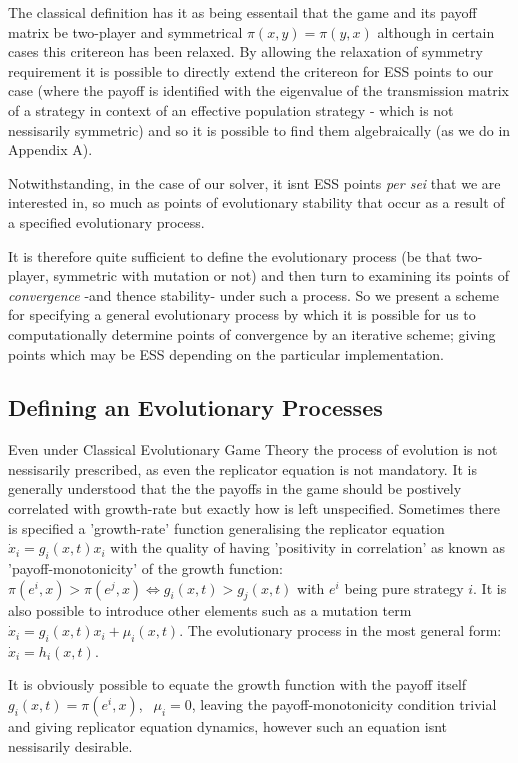 \documentclass[journal,article,accept,oneauthors,pdftex,10pt,a4paper]{mdpi}
\begin{document}
The classical definition has it as being essentail that the game and its payoff matrix be two-player and symmetrical $\pi(x,y)=\pi(y,x)$ although in certain cases this critereon has been relaxed\cite{replicator1}.
By allowing the relaxation of symmetry requirement it is possible to directly extend the critereon for ESS points to our case (where the payoff is identified with the eigenvalue of the transmission matrix of a strategy in context of an effective population strategy - which is not nessisarily symmetric) and so it is possible to find them algebraically (as we do in Appendix A).

Notwithstanding, in the case of our solver, it isnt ESS points \textit{per sei} that we are interested in, so much as points of evolutionary stability that occur as a result of a specified evolutionary process.

It is therefore quite sufficient to define the evolutionary process (be that two-player, symmetric with mutation or not) and then turn to examining its points of \textit{convergence} -and thence stability- under such a process.
So we present a scheme for specifying a general evolutionary process by which it is possible for us to computationally determine points of convergence by an iterative scheme; giving points which may be ESS depending on the particular implementation.

\subsection{Defining an Evolutionary Processes}

Even under Classical Evolutionary Game Theory the process of evolution is not nessisarily prescribed, as even the replicator equation is not mandatory.
It is generally understood that the the payoffs in the game should be postively correlated with growth-rate but exactly how is left unspecified.
Sometimes there is specified a 'growth-rate' function generalising the replicator equation $\dot{x}_i=g_i(x,t)x_i$ with the quality of having 'positivity in correlation' as known as 'payoff-monotonicity' of the growth function: $\pi(e^i,x) > \pi(e^j,x) \Leftrightarrow g_i(x,t) > g_j(x,t)$\cite{weibull} with $e^i$ being pure strategy $i$.
It is also possible to introduce other elements such as a mutation term $\dot{x}_i=g_i(x,t)x_i+\mu_i(x,t)$\cite{nowak}.
The evolutionary process in the most general form: $\dot{x}_i=h_i(x,t)$.

It is obviously possible to equate the growth function with the payoff itself $ g_i(x,t) = \pi(e^i,x)$, $~~\mu_i=0$, leaving the payoff-monotonicity condition trivial and giving replicator equation dynamics, however such an equation isnt nessisarily desirable.
\end{document}
